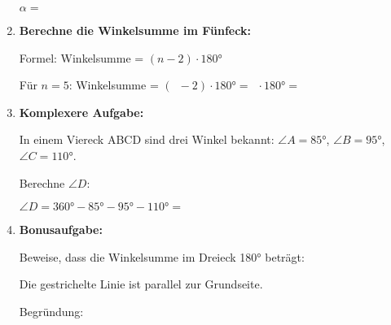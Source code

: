 \begin{enumerate}[label=\arabic*., resume]
    $\alpha = $ \underline{\hspace{3cm}}

    \vspace{1cm}

    \item \textbf{Berechne die Winkelsumme im Fünfeck:}

    \vspace{0.5cm}

    Formel: Winkelsumme = $(n-2) \cdot 180°$

    Für $n = 5$: Winkelsumme = $(\phantom{0}-2) \cdot 180° = \phantom{0} \cdot 180° = $ \underline{\hspace{3cm}}

    \vspace{1cm}

    \item \textbf{Komplexere Aufgabe:}

    In einem Viereck ABCD sind drei Winkel bekannt: $\angle A = 85°$, $\angle B = 95°$, $\angle C = 110°$.

    Berechne $\angle D$:

    $\angle D = 360° - 85° - 95° - 110° = $ \underline{\hspace{3cm}}

    \vspace{1cm}

    \item \textbf{Bonusaufgabe:}

    Beweise, dass die Winkelsumme im Dreieck 180° beträgt:

    \begin{center}
    \end{center}

    Die gestrichelte Linie ist parallel zur Grundseite.

    Begründung: \underline{\hspace{8cm}}

    \underline{\hspace{10cm}}

\end{enumerate}